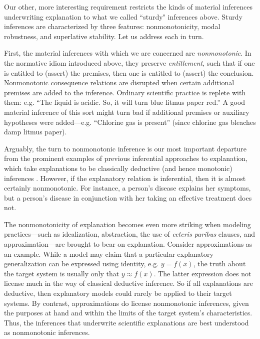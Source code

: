\documentclass{article}                     %
\begin{document}
Our other, more interesting requirement restricts the kinds of material inferences underwriting explanation to what we called ``sturdy" inferences above. Sturdy inferences are characterized by three features: nonmonotonicity, modal robustness, and superlative stability. Let us address each in turn.

First, the material inferences with which we are concerned are \textit{nonmonotonic}. In the normative idiom introduced above, they preserve \textit{entitlement}, such that if one is entitled to (assert) the premises, then one is entitled to (assert) the conclusion.  Nonmonotonic consequence relations are disrupted when certain additional premises are added to the inference. Ordinary scientific practice is replete with them: e.g. ``The liquid is acidic. So, it will turn blue litmus paper red.'' A good material inference of this sort might turn bad if additional premises or auxiliary hypotheses were added---e.g. ``Chlorine gas is present'' (since chlorine gas bleaches damp litmus paper). 

Arguably, the turn to nonmonotonic inference is our most important departure from the prominent examples of previous inferential approaches to explanation, which take explanations to be classically deductive (and hence monotonic) inferences \citep{Hempel1965,Kitcher1989}. However, if the explanatory relation is inferential, then it is almost certainly nonmonotonic. For instance, a person's disease explains her symptoms, but a person's disease in conjunction with her taking an effective treatment does not. 

The nonmonotonicity of explanation becomes even more striking when modeling practices---such as idealization, abstraction, the use of \textit{ceteris paribus} clauses, and approximation---are brought to bear on explanation. Consider approximations as an example. While a model may claim that a particular explanatory generalization can be expressed using identity, e.g. $y = f(x)$, the truth about the target system is usually only that $y \approx f(x)$. The latter expression does not license much in the way of classical deductive inference. So if all explanations are deductive, then explanatory models could rarely be applied to their target systems.  By contrast, approximations do license nonmonotonic inferences, given the purposes at hand and within the limits of the target system's characteristics.  Thus, the inferences that underwrite scientific explanations are best understood as nonmonotonic inferences.
\end{document}
